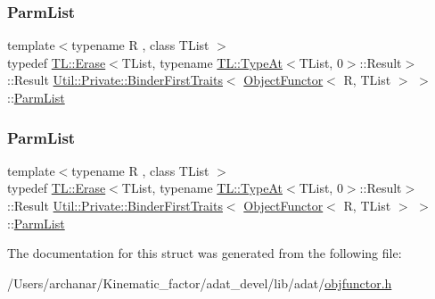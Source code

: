 \mbox{\label{structUtil_1_1Private_1_1BinderFirstTraits_3_01ObjectFunctor_3_01R_00_01TList_01_4_01_4_a181ef1a7b945beef449f25ba47f49bbc}} 
\subsubsection{\texorpdfstring{ParmList}{ParmList}\hspace{0.1cm}{\footnotesize\ttfamily [1/2]}}
{\footnotesize\ttfamily template$<$typename R , class T\+List $>$ \\
typedef \mbox{\hyperlink{structUtil_1_1TL_1_1Erase}{T\+L\+::\+Erase}}$<$T\+List, typename \mbox{\hyperlink{structUtil_1_1TL_1_1TypeAt}{T\+L\+::\+Type\+At}}$<$T\+List, 0$>$\+::Result$>$\+::Result \mbox{\hyperlink{structUtil_1_1Private_1_1BinderFirstTraits}{Util\+::\+Private\+::\+Binder\+First\+Traits}}$<$ \mbox{\hyperlink{classUtil_1_1ObjectFunctor}{Object\+Functor}}$<$ R, T\+List $>$ $>$\+::\mbox{\hyperlink{structUtil_1_1Private_1_1BinderFirstTraits_3_01ObjectFunctor_3_01R_00_01TList_01_4_01_4_a181ef1a7b945beef449f25ba47f49bbc}{Parm\+List}}}

\mbox{\label{structUtil_1_1Private_1_1BinderFirstTraits_3_01ObjectFunctor_3_01R_00_01TList_01_4_01_4_a181ef1a7b945beef449f25ba47f49bbc}} 
\subsubsection{\texorpdfstring{ParmList}{ParmList}\hspace{0.1cm}{\footnotesize\ttfamily [2/2]}}
{\footnotesize\ttfamily template$<$typename R , class T\+List $>$ \\
typedef \mbox{\hyperlink{structUtil_1_1TL_1_1Erase}{T\+L\+::\+Erase}}$<$T\+List, typename \mbox{\hyperlink{structUtil_1_1TL_1_1TypeAt}{T\+L\+::\+Type\+At}}$<$T\+List, 0$>$\+::Result$>$\+::Result \mbox{\hyperlink{structUtil_1_1Private_1_1BinderFirstTraits}{Util\+::\+Private\+::\+Binder\+First\+Traits}}$<$ \mbox{\hyperlink{classUtil_1_1ObjectFunctor}{Object\+Functor}}$<$ R, T\+List $>$ $>$\+::\mbox{\hyperlink{structUtil_1_1Private_1_1BinderFirstTraits_3_01ObjectFunctor_3_01R_00_01TList_01_4_01_4_a181ef1a7b945beef449f25ba47f49bbc}{Parm\+List}}}



The documentation for this struct was generated from the following file\+:\begin{DoxyCompactItemize}
\item 
/\+Users/archanar/\+Kinematic\+\_\+factor/adat\+\_\+devel/lib/adat/\mbox{\hyperlink{lib_2adat_2objfunctor_8h}{objfunctor.\+h}}\end{DoxyCompactItemize}
